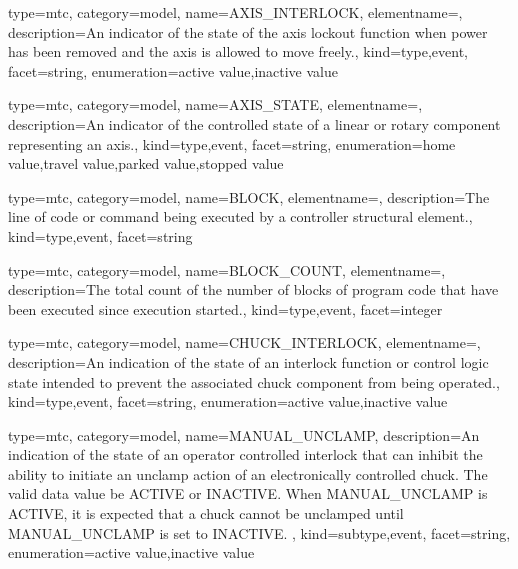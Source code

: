 {
  type=mtc,
  category=model,
  name={AXIS\_INTERLOCK},
  elementname=,
  description={An indicator of the state of the axis lockout function when power has been removed and the axis is allowed to move freely.},
  kind={type,event},
  facet={\gls{string}},
  enumeration={\gls{active value},\gls{inactive value}}
}


{
  type=mtc,
  category=model,
  name={AXIS\_STATE},
  elementname=,
  description={An indicator of the controlled state of a \gls{linear} or \gls{rotary} component representing an axis.},
  kind={type,event},
  facet={\gls{string}},
  enumeration={\gls{home value},\gls{travel value},\gls{parked value},\gls{stopped value}}
}


{
  type=mtc,
  category=model,
  name={BLOCK},
  elementname=,
  description={The line of code or command being executed by a \gls{controller} \gls{structural element}.},
  kind={type,event},
  facet={\gls{string}}
}


{
  type=mtc,
  category=model,
  name={BLOCK\_COUNT},
  elementname=,
  description={The total count of the number of blocks of program code that have been executed since execution started.},
  kind={type,event},
  facet={\gls{integer}}
}


{
  type=mtc,
  category=model,
  name={CHUCK\_INTERLOCK},
  elementname=,
  description={An indication of the state of an interlock function or control logic state intended to prevent the associated \gls{chuck} component from being operated.},
  kind={type,event},
  facet={\gls{string}},
  enumeration={\gls{active value},\gls{inactive value}}
}


{
  type=mtc,
  category=model,
  name={MANUAL\_UNCLAMP},
  description={An indication of the state of an operator controlled interlock that can inhibit the ability to initiate an unclamp action of an electronically controlled chuck.  The \gls{valid data value} \must be ACTIVE or INACTIVE. \newline When MANUAL\_UNCLAMP is ACTIVE, it is expected that a chuck cannot be unclamped until MANUAL\_UNCLAMP is set to INACTIVE. },
  kind={subtype,event},
  facet={\gls{string}},
  enumeration={\gls{active value},\gls{inactive value}}
}



